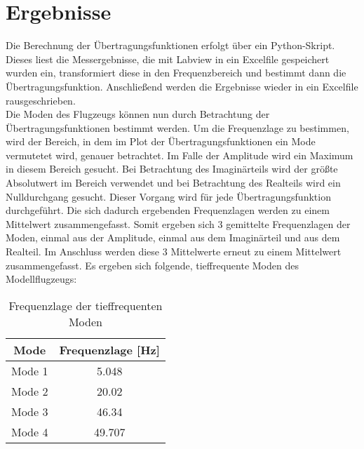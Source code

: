 \section{Ergebnisse}
    Die Berechnung der Übertragungsfunktionen erfolgt über ein Python-Skript.
    Dieses liest die Messergebnisse, die mit Labview in ein  Excelfile
    gespeichert wurden ein, transformiert diese in den Frequenzbereich und
    bestimmt dann die Übertragungsfunktion. Anschließend werden die Ergebnisse
    wieder in ein Excelfile rausgeschrieben.
    \\

    \noindent
    Die Moden des Flugzeugs können nun durch Betrachtung der
    Übertragungsfunktionen bestimmt werden. Um die Frequenzlage zu bestimmen,
    wird der Bereich, in dem im Plot der Übertragungsfunktionen ein Mode
    vermutetet wird, genauer betrachtet. Im Falle der Amplitude wird ein
    Maximum in diesem Bereich gesucht. Bei Betrachtung des Imaginärteils wird der
    größte Absolutwert im Bereich verwendet und bei Betrachtung des Realteils
    wird ein Nulldurchgang gesucht. Dieser Vorgang wird für jede
    Übertragungsfunktion durchgeführt. Die sich dadurch ergebenden
    Frequenzlagen werden zu einem Mittelwert zusammengefasst. Somit ergeben sich
    3 gemittelte Frequenzlagen der Moden, einmal aus der Amplitude, einmal aus 
    dem Imaginärteil und aus dem Realteil. Im Anschluss werden diese 3
    Mittelwerte erneut zu einem Mittelwert zusammengefasst. Es ergeben sich
    folgende, tieffrequente Moden des Modellflugzeugs:

    \begin{table}[H]
        \centering
        \begin{tabular}{|c|c|}
            \hline
            \textbf{Mode}   &   \textbf{Frequenzlage [Hz]}  \\
            \hline \hline
            Mode 1  &   5.048 \\
            \hline
            Mode 2  &   20.02 \\
            \hline
            Mode 3  &   46.34 \\
            \hline
            Mode 4  &   49.707 \\
            \hline            
        \end{tabular}
        \caption{Frequenzlage der tieffrequenten Moden}
        \label{tab: Frequenzlage_Moden}
    \end{table}

